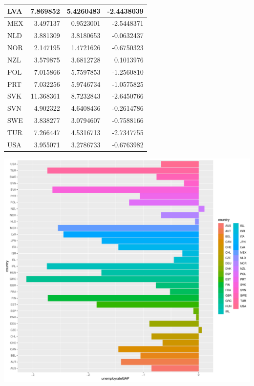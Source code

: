 \documentclass[11pt,a4paper,]{article}
\let\origfigure\figure
\let\endorigfigure\endfigure
\renewenvironment{figure}[1][2] {
    \expandafter\origfigure\expandafter[H]
} {
    \endorigfigure
}%
\begin{document}
\begin{table}[H]
\begin{tabular}[t]{l|r|r|r}
\hline
LVA & 7.869852 & 5.4260483 & -2.4438039\\
\hline
\rowcolor{gray!6}  MEX & 3.497137 & 0.9523001 & -2.5448371\\
\hline
NLD & 3.881309 & 3.8180653 & -0.0632437\\
\hline
\rowcolor{gray!6}  NOR & 2.147195 & 1.4721626 & -0.6750323\\
\hline
NZL & 3.579875 & 3.6812728 & 0.1013976\\
\hline
\rowcolor{gray!6}  POL & 7.015866 & 5.7597853 & -1.2560810\\
\hline
PRT & 7.032256 & 5.9746734 & -1.0575825\\
\hline
\rowcolor{gray!6}  SVK & 11.368361 & 8.7232843 & -2.6450766\\
\hline
SVN & 4.902322 & 4.6408436 & -0.2614786\\
\hline
\rowcolor{gray!6}  SWE & 3.838277 & 3.0794607 & -0.7588166\\
\hline
TUR & 7.266447 & 4.5316713 & -2.7347755\\
\hline
\rowcolor{gray!6}  USA & 3.955071 & 3.2786733 & -0.6763982\\
\hline
\end{tabular}
\end{table}

\newpage

\begin{figure}
\centering
\includegraphics{ETC5513assignment4_files/figure-latex/GAP-1.pdf}
\caption{\label{fig:GAP}unemployment gender gap}
\end{figure}
\end{document}
